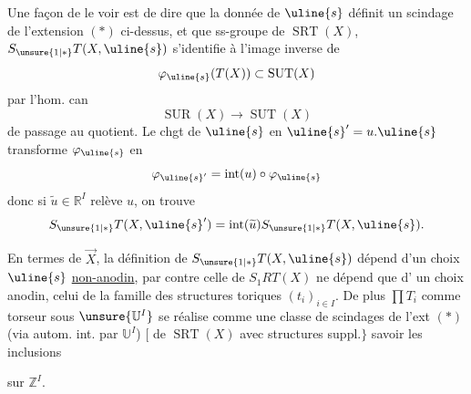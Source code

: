 
Une façon de le voir est de dire que
la donnée de $\uline{s}$ définit un scindage
 de
l'extension $(*)$ ci-dessus, et que 
ss-groupe de $\operatorname{SRT}(X)$,
$S_{\unsure{1|*}}T(X,\uline{s})$ s'identifie
à l'image inverse de
\[
\varphi_{\uline{s}}(T(X))\subset\operatorname{SUT}(X)
\]
par l'hom. can
\[
\operatorname{SUR}(X)\longrightarrow\operatorname{SUT}(X)
\]
de passage au quotient. Le chgt de
$\uline{s}$ en $\uline{s}'=u.\uline{s}$
transforme $\varphi_{\uline{s}}$ en
\[
\varphi_{\uline{s}'}=\operatorname{int}(u)\circ\varphi_{\uline{s}}
\]
donc si $\widetilde u\in\mathbb R^I$ relève $u$, on trouve
\[
S_{\unsure{1|*}}T(X,\uline{s}')
=\operatorname{int}(\widetilde u)S_{\unsure{1|*}}T(X,\uline{s}).
\]

En termes de $\vec X$, la définition de
$S_{\unsure{1|*}}T(X,\uline{s})$
dépend d'un choix $\uline{s}$ \uline{non-anodin},
par contre celle de $S_1RT(X)$ ne dépend que d'
un choix anodin, celui de la famille des
structures toriques $(t_i)_{i\in I}$.
De plus $\prod T_i$ comme
torseur sous $\unsure{\mathbb U^I}$ se réalise
comme une classe de scindages de l'ext $(*)$
(via autom. int. par $\mathbb U^I$)
$\bigl[$ de $\operatorname{SRT}(X)$
avec  structures suppl.$\bigr\}$
savoir les inclusions


 sur $\mathbb Z^I$.

